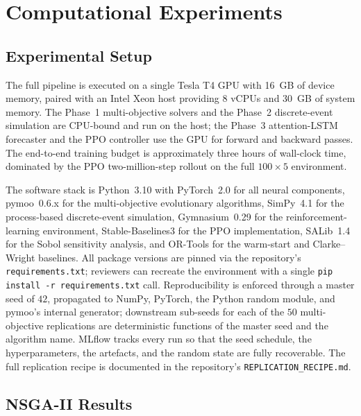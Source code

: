 \documentclass[review,preprint,authoryear,12pt]{elsarticle}
\begin{document}
\section{Computational Experiments}
\label{sec:experiments}

\subsection{Experimental Setup}
\label{sec:experiments:setup}

The full pipeline is executed on a single Tesla T4 GPU with 16~GB of
device memory, paired with an Intel Xeon host providing 8 vCPUs and
30~GB of system memory. The Phase~1 multi-objective solvers and the
Phase~2 discrete-event simulation are CPU-bound and run on the host;
the Phase~3 attention-LSTM forecaster and the PPO controller use the
GPU for forward and backward passes. The end-to-end training budget
is approximately three hours of wall-clock time, dominated by the
PPO two-million-step rollout on the full $100 \times 5$ environment.

The software stack is Python~3.10 with PyTorch~2.0 for all neural
components, pymoo~0.6.x \citep{blank2020pymoo} for the multi-objective
evolutionary algorithms, SimPy~4.1 \citep{simpy41_docs} for the
process-based discrete-event simulation, Gymnasium~0.29
\citep{towers2024gymnasium} for the reinforcement-learning
environment, Stable-Baselines3 for the PPO implementation, SALib~1.4
\citep{herman2017salib} for the Sobol sensitivity analysis, and
OR-Tools for the warm-start and Clarke--Wright baselines. All package
versions are pinned via the repository's \texttt{requirements.txt};
reviewers can recreate the environment with a single
\texttt{pip install -r requirements.txt} call. Reproducibility is
enforced through a master seed of $42$, propagated to NumPy, PyTorch,
the Python random module, and pymoo's internal generator; downstream
sub-seeds for each of the $50$ multi-objective replications are
deterministic functions of the master seed and the algorithm name.
MLflow tracks every run so that the seed schedule, the hyperparameters,
the artefacts, and the random state are fully recoverable. The full
replication recipe is documented in the repository's
\texttt{REPLICATION\_RECIPE.md}.

\subsection{NSGA-II Results}
\label{sec:experiments:nsga2}
\end{document}
